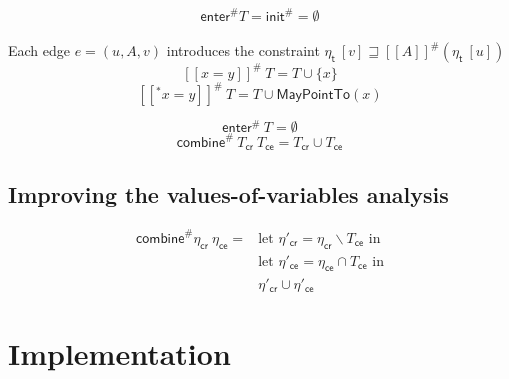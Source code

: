       \[\textsf{enter}^{\#} T = \textsf{init}^{\#} = \emptyset\]
      \\
      Each edge $e = (u, A, v)$ introduces the constraint $\eta_\textsf{t}\ [v] \sqsupseteq [\![  A ]\!]^{\#}  (\eta_\textsf{t}\ [u]) $\\
      \[ [\![ x = y ]\!] ^{\#}\ T =  T \cup \{x\} \]
      \[ [\![ ^*x = y ]\!] ^{\#}\ T =  T \cup \textsf{MayPointTo}(x) \]
      
      \[ \textsf{enter}^{\#}\ T = \emptyset\]
      \[ \textsf{combine}^{\#}\ T_\textsf{cr}\ T_\textsf{ce} = T_\textsf{cr} \cup T_\textsf{ce} \]

    \subsection{Improving the values-of-variables analysis}
      \begin{align}
        \textsf{combine}^{\#} \eta_\textsf{cr}\ \eta_\textsf{ce} = & \text{let } \eta'_\textsf{cr} = \eta_\textsf{cr} \backslash T_\textsf{ce} \text{ in} \\
        & \text{let } \eta'_\textsf{ce} = \eta_\textsf{ce} \cap T_\textsf{ce} \text{ in} \\
        & \eta'_\textsf{cr} \cup \eta'_\textsf{ce}
      \end{align}

  \section{Implementation}


